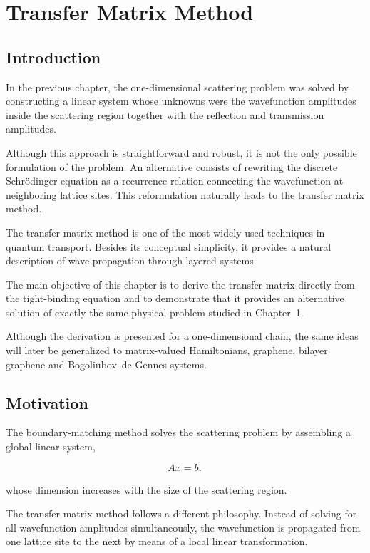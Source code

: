 \chapter{Transfer Matrix Method}

\section{Introduction}

In the previous chapter, the one-dimensional scattering problem was
solved by constructing a linear system whose unknowns were the
wavefunction amplitudes inside the scattering region together with the
reflection and transmission amplitudes.

Although this approach is straightforward and robust, it is not the only
possible formulation of the problem. An alternative consists of
rewriting the discrete Schrödinger equation as a recurrence relation
connecting the wavefunction at neighboring lattice sites. This
reformulation naturally leads to the transfer matrix method.

The transfer matrix method is one of the most widely used techniques in
quantum transport. Besides its conceptual simplicity, it provides a
natural description of wave propagation through layered systems.

The main objective of this chapter is to derive the transfer matrix
directly from the tight-binding equation and to demonstrate that it
provides an alternative solution of exactly the same physical problem
studied in Chapter~1.

Although the derivation is presented for a one-dimensional chain, the
same ideas will later be generalized to matrix-valued Hamiltonians,
graphene, bilayer graphene and Bogoliubov--de Gennes systems.


\section{Motivation}

The boundary-matching method solves the scattering problem by assembling
a global linear system,

\begin{equation}
	A x = b,
\end{equation}

whose dimension increases with the size of the scattering region.

The transfer matrix method follows a different philosophy. Instead of
solving for all wavefunction amplitudes simultaneously, the wavefunction
is propagated from one lattice site to the next by means of a local
linear transformation.

